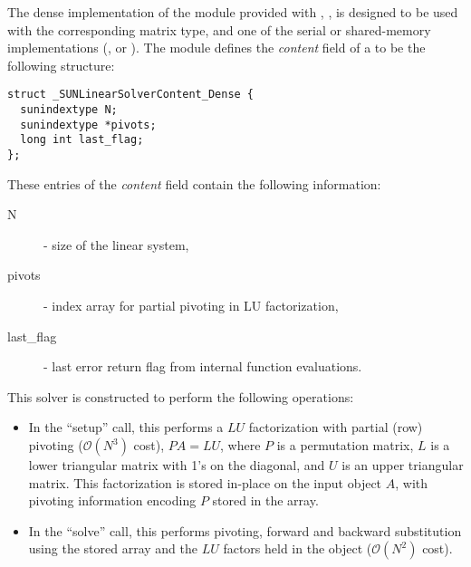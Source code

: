 
The dense implementation of the {\sunlinsol} module provided with
{\sundials}, {\sunlinsoldense}, is designed to be used with the
corresponding {\sunmatdense} matrix type, and one of the serial or
shared-memory {\nvector} implementations ({\nvecs}, {\nvecopenmp} or
{\nvecpthreads}).  The {\sunlinsoldense} module defines the {\em
content} field of a  to be the following structure:
\begin{verbatim} 
struct _SUNLinearSolverContent_Dense {
  sunindextype N;
  sunindextype *pivots;
  long int last_flag;
};
\end{verbatim}
These entries of the \emph{content} field contain the following
information:
\begin{description}
  \item[N] - size of the linear system,
  \item[pivots] - index array for partial pivoting in LU factorization,
  \item[last\_flag] - last error return flag from internal function evaluations.
\end{description}

This solver is constructed to perform the following operations:
\begin{itemize}
\item In the ``setup'' call, this performs a $LU$ factorization with
  partial (row) pivoting ($\mathcal O(N^3)$ cost), $PA=LU$, where $P$
  is a permutation matrix, $L$ is a lower triangular matrix with 1's
  on the diagonal, and $U$ is an upper triangular matrix.  This
  factorization is stored in-place on the input {\sunmatdense} object
  $A$, with pivoting information encoding $P$ stored in
  the  array.
\item In the ``solve'' call, this performs pivoting, forward and
  backward substitution using the stored  array and the
  $LU$ factors held in the {\sunmatdense} object ($\mathcal O(N^2)$
  cost).
\end{itemize}

